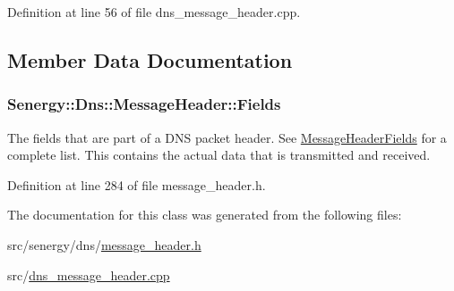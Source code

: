 Definition at line 56 of file dns\-\_\-message\-\_\-header.\-cpp.



\subsection{Member Data Documentation}
\hypertarget{class_senergy_1_1_dns_1_1_message_header_a014c173ce2b2c5bb06ae9e5d0e201159}{
\subsubsection[{Fields}]{ Senergy\-::\-Dns\-::\-Message\-Header\-::\-Fields}}\label{class_senergy_1_1_dns_1_1_message_header_a014c173ce2b2c5bb06ae9e5d0e201159}


The fields that are part of a D\-N\-S packet header. See \hyperlink{struct_senergy_1_1_dns_1_1_message_header_fields}{Message\-Header\-Fields} for a complete list. This contains the actual data that is transmitted and received. 



Definition at line 284 of file message\-\_\-header.\-h.



The documentation for this class was generated from the following files\-:\begin{DoxyCompactItemize}
\item 
src/senergy/dns/\hyperlink{message__header_8h}{message\-\_\-header.\-h}\item 
src/\hyperlink{dns__message__header_8cpp}{dns\-\_\-message\-\_\-header.\-cpp}\end{DoxyCompactItemize}
